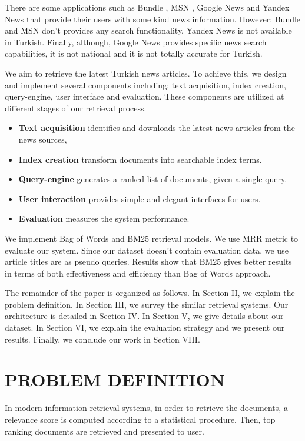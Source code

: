 \documentclass[conference]{IEEEtran}
\begin{document}
There are some applications such as Bundle \cite{bundle}, MSN \cite{msn}, Google News \cite{google} and Yandex News \cite{yandex} that provide their users with some kind news information. However; Bundle and MSN don't provides any search functionality. Yandex News is not available in Turkish. Finally, although, Google News provides specific news search capabilities, it is not national and it is not totally accurate for Turkish.

We aim to retrieve the latest Turkish news articles. To achieve this, we design and implement several components including; text acquisition, index creation, query-engine, user interface and evaluation. These components are utilized at different stages of our retrieval process.

\begin{itemize}
\item \textbf{Text acquisition} identifies and downloads the latest news articles from the news sources,
\item \textbf{Index creation} transform documents into searchable index terms.
\item \textbf{Query-engine} generates a ranked list of documents, given a single query.
\item \textbf{User interaction} provides simple and elegant interfaces for users.
\item \textbf{Evaluation} measures the system performance.
\end{itemize}

We implement Bag of Words and BM25 retrieval models. We use MRR metric to evaluate our system. Since our dataset doesn't contain evaluation data, we use article titles are as pseudo queries. Results show that BM25 gives better results in terms of both effectiveness and efficiency than Bag of Words approach.

The remainder of the paper is organized as follows. In Section II, we explain the problem definition. In Section III, we survey the similar retrieval systems. Our architecture is detailed in Section IV. In Section V, we give details about our dataset. In Section VI, we explain the evaluation strategy and we present our results. Finally, we conclude our work in Section VIII.

\section{PROBLEM DEFINITION}

In modern information retrieval systems, in order to retrieve the documents, a relevance score is computed according to a statistical procedure. Then, top ranking documents are retrieved and presented to user.
\end{document}
